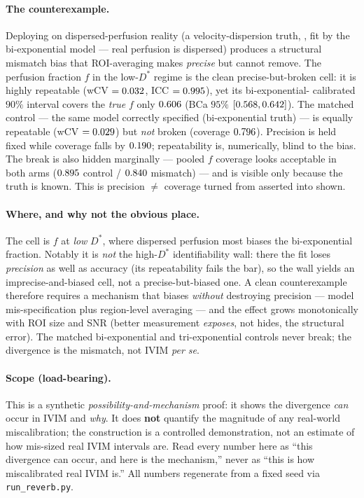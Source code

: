 \documentclass[11pt]{article}
\newcommand{\Dstar}{D^{*}}
\begin{document}
\paragraph{The counterexample.} Deploying on dispersed-perfusion reality (a velocity-dispersion
truth, \texttt{\numReverbFamily}, fit by the bi-exponential model --- real perfusion is dispersed)
produces a structural mismatch bias that ROI-averaging makes \emph{precise} but cannot remove. The
perfusion fraction $f$ in the low-$\Dstar$ regime is the clean precise-but-broken cell: it is
highly repeatable (wCV $=0.032$, ICC $=0.995$), yet its bi-exponential-
calibrated $90\%$ interval covers the \emph{true} $f$ only $0.606$
(BCa $95\%$ $[0.568,0.642]$). The matched control --- the same model
correctly specified (bi-exponential truth) --- is equally repeatable (wCV $=0.029$) but
\emph{not} broken (coverage $0.796$). Precision is held fixed while coverage falls by
$0.190$; repeatability is, numerically, blind to the bias. The break is also hidden
marginally --- pooled $f$ coverage looks acceptable in both arms ($0.895$ control /
$0.840$ mismatch) --- and is visible only because the truth is known. This is
precision $\ne$ coverage turned from asserted into shown.

\paragraph{Where, and why not the obvious place.} The cell is $f$ at \emph{low} $\Dstar$, where
dispersed perfusion most biases the bi-exponential fraction. Notably it is \emph{not} the
high-$\Dstar$ identifiability wall: there the fit loses \emph{precision} as well as accuracy
(its repeatability fails the bar), so the wall yields an imprecise-and-biased cell, not a
precise-but-biased one. A clean counterexample therefore requires a mechanism that biases
\emph{without} destroying precision --- model mis-specification plus region-level averaging --- and
the effect grows monotonically with ROI size and SNR (better measurement \emph{exposes}, not hides,
the structural error). The matched bi-exponential and tri-exponential controls never break; the
divergence is the mismatch, not IVIM \emph{per se}.

\paragraph{Scope (load-bearing).} This is a synthetic \emph{possibility-and-mechanism} proof: it
shows the divergence \emph{can} occur in IVIM and \emph{why}. It does \textbf{not} quantify the
magnitude of any real-world miscalibration; the construction is a controlled demonstration, not an
estimate of how mis-sized real IVIM intervals are. Read every number here as ``this divergence can
occur, and here is the mechanism,'' never as ``this is how miscalibrated real IVIM is.'' All
numbers regenerate from a fixed seed via \texttt{run\_reverb.py}.
\end{document}
